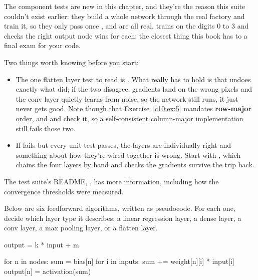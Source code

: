 The component tests are new in this chapter, and they're the reason this suite couldn't exist
earlier: they build a whole network through the real factory and train it, so they only pass once
,  and  are all real.
 trains on the digits 0 to 3 and checks the right output node
wins for each; the closest thing this book has to a final exam for your code.

Two things worth knowing before you start:
\begin{itemize}
  \item The one flatten layer test to read is . What really
    has to hold is that  undoes exactly what  did; if the
    two disagree, gradients land on the wrong pixels and the conv layer quietly learns from noise,
    so the network still runs, it just never gets good. Note though that
    Exercise~\ref{c10:ex:5} mandates \textbf{row-major} order, and  and
     check it, so a self-consistent column-major implementation still
    fails those two.
  \item If  fails but every unit test passes, the layers are
    individually right and something about how they're wired together is wrong. Start with
    , which chains the four layers by hand
    and checks the gradients survive the trip back.
\end{itemize}
The test suite's README, , has more
information, including how the convergence thresholds were measured.

\label{c10:set:4}\label{c10:app:c}

\label{c10:ex:10}
Below are six feedforward algorithms, written as pseudocode. For each one, decide which layer type
it describes: a linear regression layer, a dense layer, a conv layer, a max pooling layer, or a
flatten layer.

\begin{pycode}
output = k * input + m
\end{pycode}

\begin{pycode}
for n in nodes:
    sum = bias[n]
    for i in inputs:
        sum += weight[n][i] * input[i]
    output[n] = activation(sum)
\end{pycode}

